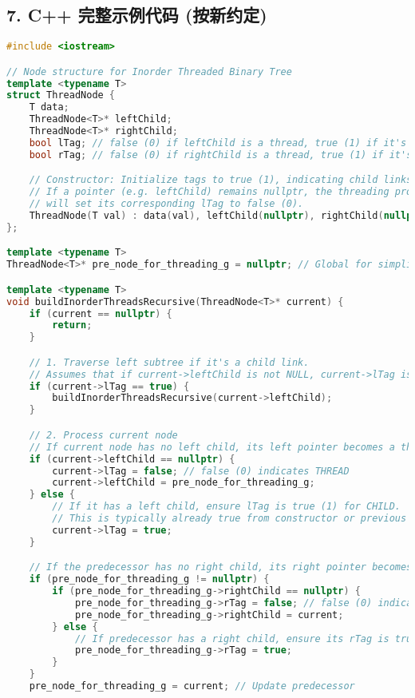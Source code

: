 \subsection{7. C++ 完整示例代码 (按新约定)}

\begin{lstlisting}[language=C++]
#include <iostream>

// Node structure for Inorder Threaded Binary Tree
template <typename T>
struct ThreadNode {
    T data;
    ThreadNode<T>* leftChild;
    ThreadNode<T>* rightChild;
    bool lTag; // false (0) if leftChild is a thread, true (1) if it's a child
    bool rTag; // false (0) if rightChild is a thread, true (1) if it's a child

    // Constructor: Initialize tags to true (1), indicating child links by default.
    // If a pointer (e.g. leftChild) remains nullptr, the threading process
    // will set its corresponding lTag to false (0).
    ThreadNode(T val) : data(val), leftChild(nullptr), rightChild(nullptr), lTag(true), rTag(true) {}
};

template <typename T>
ThreadNode<T>* pre_node_for_threading_g = nullptr; // Global for simplicity

template <typename T>
void buildInorderThreadsRecursive(ThreadNode<T>* current) {
    if (current == nullptr) {
        return;
    }

    // 1. Traverse left subtree if it's a child link.
    // Assumes that if current->leftChild is not NULL, current->lTag is initially true (1).
    if (current->lTag == true) {
        buildInorderThreadsRecursive(current->leftChild);
    }

    // 2. Process current node
    // If current node has no left child, its left pointer becomes a thread.
    if (current->leftChild == nullptr) {
        current->lTag = false; // false (0) indicates THREAD
        current->leftChild = pre_node_for_threading_g;
    } else {
        // If it has a left child, ensure lTag is true (1) for CHILD.
        // This is typically already true from constructor or previous steps if tree was built with tags.
        current->lTag = true;
    }

    // If the predecessor has no right child, its right pointer becomes a thread to current.
    if (pre_node_for_threading_g != nullptr) {
        if (pre_node_for_threading_g->rightChild == nullptr) {
            pre_node_for_threading_g->rTag = false; // false (0) indicates THREAD
            pre_node_for_threading_g->rightChild = current;
        } else {
            // If predecessor has a right child, ensure its rTag is true (1) for CHILD.
            pre_node_for_threading_g->rTag = true;
        }
    }
    pre_node_for_threading_g = current; // Update predecessor


\end{lstlisting}
